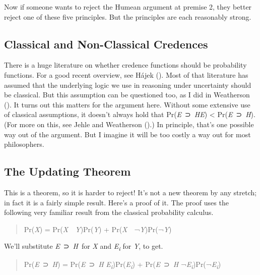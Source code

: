 \documentclass[
  10pt,
  letterpaper,
  DIV=11,
  numbers=noendperiod,
  twoside]{scrartcl}
\begin{document}
Now if someone wants to reject the Humean argument at premise 2, they
better reject one of these five principles. But the principles are each
reasonably strong.

\subsection{Classical and Non-Classical
Credences}\label{classical-and-non-classical-credences}

There is a huge literature on whether credence functions should be
probability functions. For a good recent overview, see Hájek
(). Most of that literature has assumed
that the underlying logic we use in reasoning under uncertainty should
be classical. But this assumption can be questioned too, as I did in
Weatherson (). It turns out this
matters for the argument here. Without some extensive use of classical
assumptions, it doesn't always hold that
Pr(\emph{E}~⊃~\emph{H}\textbar{}\emph{E}) \textless{}
Pr(\emph{E}~⊃~\emph{H}). (For more on this, see Jehle and Weatherson
().) In principle, that's one
possible way out of the argument. But I imagine it will be too costly a
way out for most philosophers.

\subsection{The Updating Theorem}\label{the-updating-theorem}

This is a theorem, so it is harder to reject! It's not a new theorem by
any stretch; in fact it is a fairly simple result. Here's a proof of it.
The proof uses the following very familiar result from the classical
probability calculus.

\begin{quote}
Pr(\emph{X}) = Pr(\emph{X}~\textbar~\emph{Y})Pr(\emph{Y}) +
Pr(\emph{X}~\textbar~¬\emph{Y})Pr(¬\emph{Y})
\end{quote}

We'll substitute \emph{E}~⊃~\emph{H}~for \emph{X} and
\emph{E\textsubscript{i}} for \emph{Y}, to get.

\begin{quote}
Pr(\emph{E}~⊃~\emph{H}) = Pr(\emph{E}~⊃~\emph{H}\textbar{}
\emph{E\textsubscript{i}})Pr(\emph{E\textsubscript{i}}) +
Pr(\emph{E}~⊃~\emph{H}\textbar{}
¬\emph{E\textsubscript{i}})Pr(¬\emph{E\textsubscript{i}})
\end{quote}
\end{document}
